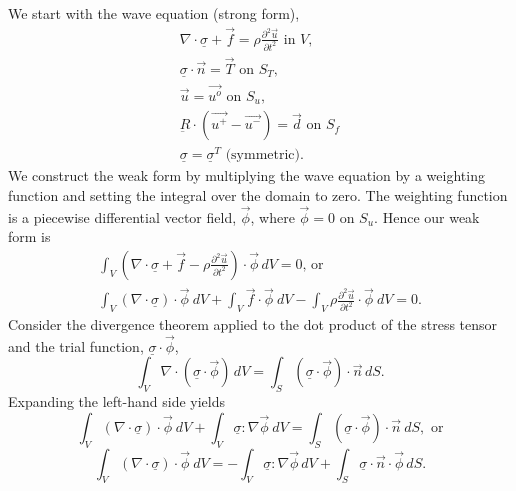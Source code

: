 We start with the wave equation (strong form),
\begin{gather}
\nabla\cdot\underline{\sigma}+\overrightarrow{f}=\rho\frac{\partial^{2}\overrightarrow{u}}{\partial t^{2}}\text{ in }V,\\
\underline{\sigma}\cdot\overrightarrow{n}=\overrightarrow{T}\text{ on }S_{T},\\
\overrightarrow{u}=\overrightarrow{u^{o}}\text{ on }S_{u},\\
\underbar{R}\cdot(\overrightarrow{u^{+}}-\overrightarrow{u^{-}})=\vec{d}\text{ on }S_{f}\\
\underline{\sigma}=\underline{\sigma}^{T}\text{ (symmetric).}
\end{gather}
We construct the weak form by multiplying the wave equation by a weighting
function and setting the integral over the domain to zero. The weighting
function is a piecewise differential vector field, $\overrightarrow{\phi}$,
where $\overrightarrow{\phi}=0$ on $S_{u}.$ Hence our weak form
is
\begin{gather}
\int_{V}\left(\nabla\cdot\underline{\sigma}+\overrightarrow{f}-\rho\frac{\partial^{2}\overrightarrow{u}}{\partial t^{2}}\right)\cdot\overrightarrow{\phi}\, dV=0\text{, or }\\
\int_{V}(\nabla\cdot\underline{\sigma})\cdot\overrightarrow{\phi}\: dV+\int_{V}\overrightarrow{f}\cdot\overrightarrow{\phi}\: dV-\int_{V}\rho\frac{\partial^{2}\overrightarrow{u}}{\partial t^{2}}\cdot\overrightarrow{\phi}\: dV=0.
\end{gather}
 Consider the divergence theorem applied to the dot product of the
stress tensor and the trial function, $\underline{\sigma}\cdot\overrightarrow{\phi}$,
\begin{equation}
\int_{V}\nabla\cdot(\underline{\sigma}\cdot\overrightarrow{\phi})\, dV=\int_{S}(\underline{\sigma}\cdot\overrightarrow{\phi})\cdot\overrightarrow{n}\, dS.
\end{equation}
Expanding the left-hand side yields
\begin{equation}
\int_{V}(\nabla\cdot\underline{\sigma})\cdot\overrightarrow{\phi}\: dV+\int_{V}\underline{\sigma}:\nabla\overrightarrow{\phi}\: dV=\int_{S}(\underline{\sigma}\cdot\overrightarrow{\phi})\cdot\overrightarrow{n}\: dS,\text{ or}
\end{equation}
\begin{equation}
\int_{V}(\nabla\cdot\underline{\sigma})\cdot\overrightarrow{\phi}\: dV=-\int_{V}\underline{\sigma}:\nabla\overrightarrow{\phi}\, dV+\int_{S}\underline{\sigma}\cdot\overrightarrow{n}\cdot\overrightarrow{\phi}\, dS.
\end{equation}
